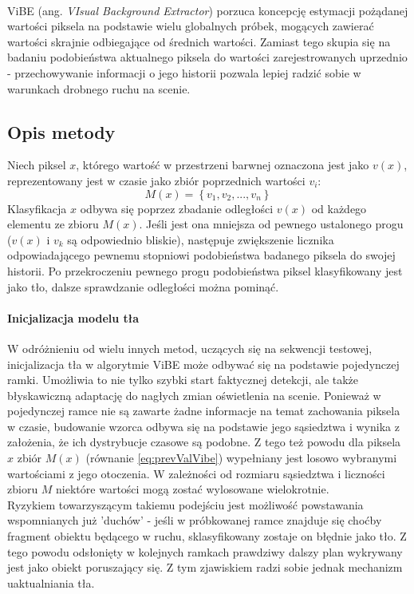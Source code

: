 \paragraph{}
ViBE (ang. \textit{VIsual Background Extractor}) porzuca koncepcję estymacji pożądanej wartości piksela na podstawie wielu globalnych próbek, mogących zawierać wartości skrajnie odbiegające od średnich wartości. Zamiast tego skupia się na badaniu podobieństwa aktualnego piksela do wartości zarejestrowanych uprzednio - przechowywanie informacji o jego historii pozwala lepiej radzić sobie w warunkach drobnego ruchu na scenie.
\subsection{Opis metody}
Niech piksel $x$, którego wartość w przestrzeni barwnej oznaczona jest jako $v(x)$, reprezentowany jest w czasie jako zbiór poprzednich wartości $v_{i}$:
\begin{equation}
\label{eq:prevValVibe}
M(x) = \left\{v_{1}, v_{2}, ..., v_{n}\right\}
\end{equation}
Klasyfikacja $x$ odbywa się poprzez zbadanie odległości $v(x)$ od każdego elementu ze zbioru $M(x)$. Jeśli jest ona mniejsza od pewnego ustalonego progu ($v(x)$ i $v_{k}$ są odpowiednio bliskie), następuje zwiększenie licznika odpowiadającego pewnemu stopniowi podobieństwa badanego piksela do swojej historii. Po przekroczeniu pewnego progu podobieństwa piksel klasyfikowany jest jako tło, dalsze sprawdzanie odległości można pominąć.
\paragraph{Inicjalizacja modelu tła \\}
W odróżnieniu od wielu innych metod, uczących się na sekwencji testowej, inicjalizacja tła w algorytmie ViBE może odbywać się na podstawie pojedynczej ramki. Umożliwia to nie tylko szybki start faktycznej detekcji, ale także błyskawiczną adaptację do nagłych zmian oświetlenia na scenie. Ponieważ w pojedynczej ramce nie są zawarte żadne informacje na temat zachowania piksela w czasie, budowanie wzorca odbywa się na podstawie jego sąsiedztwa i wynika z założenia, że ich dystrybucje czasowe są podobne. Z tego też powodu dla piksela $x$ zbiór $M(x)$ (równanie \ref{eq:prevValVibe}) wypełniany jest losowo wybranymi wartościami z jego otoczenia. W zależności od rozmiaru sąsiedztwa i liczności zbioru $M$ niektóre wartości mogą zostać wylosowane wielokrotnie.\\
Ryzykiem towarzyszącym takiemu podejściu jest możliwość powstawania wspomnianych już 'duchów' - jeśli w próbkowanej ramce znajduje się choćby fragment obiektu będącego w ruchu, sklasyfikowany zostaje on błędnie jako tło. Z tego powodu odsłonięty w kolejnych ramkach prawdziwy dalszy plan wykrywany jest jako obiekt poruszający się. Z tym zjawiskiem radzi sobie jednak mechanizm uaktualniania tła.
